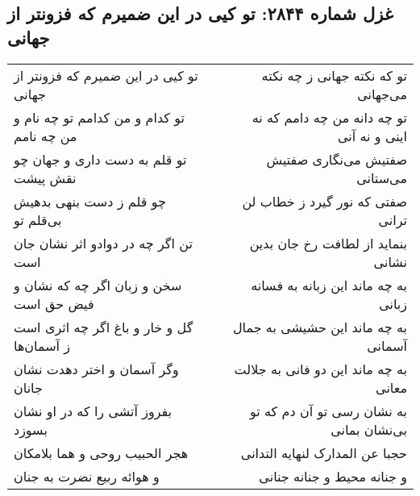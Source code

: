 \begin{center}
\section*{غزل شماره ۲۸۴۴: تو کیی در این ضمیرم که فزونتر از جهانی}
\label{sec:2844}
\begin{longtable}{l p{0.5cm} r}
تو کیی در این ضمیرم که فزونتر از جهانی
&&
تو که نکته جهانی ز چه نکته می‌جهانی
\\
تو کدام و من کدامم تو چه نام و من چه نامم
&&
تو چه دانه من چه دامم که نه اینی و نه آنی
\\
تو قلم به دست داری و جهان چو نقش پیشت
&&
صفتیش می‌نگاری صفتیش می‌ستانی
\\
چو قلم ز دست بنهی بدهیش بی‌قلم تو
&&
صفتی که نور گیرد ز خطاب لن ترانی
\\
تن اگر چه در دوادو اثر نشان جان است
&&
بنماید از لطافت رخ جان بدین نشانی
\\
سخن و زبان اگر چه که نشان و فیض حق است
&&
به چه ماند این زبانه به فسانه زبانی
\\
گل و خار و باغ اگر چه اثری است ز آسمان‌ها
&&
به چه ماند این حشیشی به جمال آسمانی
\\
وگر آسمان و اختر دهدت نشان جانان
&&
به چه ماند این دو فانی به جلالت معانی
\\
بفروز آتشی را که در او نشان بسوزد
&&
به نشان رسی تو آن دم که تو بی‌نشان بمانی
\\
هجر الحبیب روحی و هما بلامکان
&&
حجبا عن المدارک لنهایه التدانی
\\
و هوائه ربیع نضرت به جنان
&&
و جنانه محیط و جنانه جنانی
\\
\end{longtable}
\end{center}
